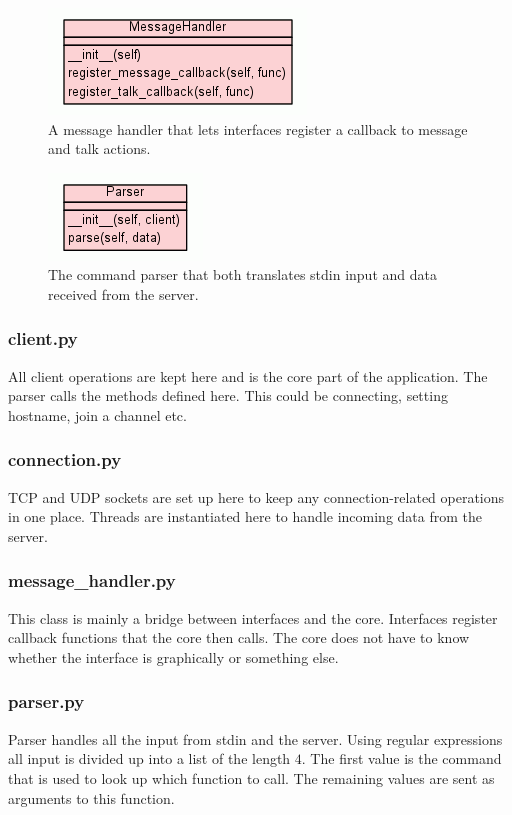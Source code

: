 \documentclass[12pt]{rapport}
\begin{document}
\begin{figure}[H]
  \begin{center}
    \includegraphics[scale=0.9]{../uml/uml_class_diagram_for_voix_mes}
    \caption{A message handler that lets interfaces register a
      callback to message and talk actions.}
  \end{center}
\end{figure}
\begin{figure}[H]
  \begin{center}
    \includegraphics[scale=0.9]{../uml/uml_class_diagram_for_voix_par}
    \caption{The command parser that both translates stdin input and
      data received from the server.}
  \end{center}
\end{figure}
\subsubsection*{client.py}
All client operations are kept here and is the core part of the
application. The parser calls the methods defined here. This could be
connecting, setting hostname, join a channel etc.
\subsubsection*{connection.py}
TCP and UDP sockets are set up here to keep any connection-related
operations in one place. Threads are instantiated here to handle
incoming data from the server.
\subsubsection*{message\_handler.py}
This class is mainly a bridge between interfaces and the
core. Interfaces register callback functions that the core then
calls. The core does not have to know whether the interface is
graphically or something else.
\subsubsection*{parser.py}
Parser handles all the input from stdin and the server. Using regular
expressions all input is divided up into a list of the length $4$. The
first value is the command that is used to look up which function to
call. The remaining values are sent as arguments to this function.
\end{document}
